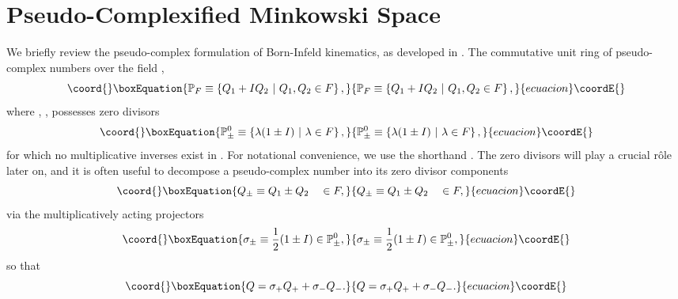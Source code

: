 \documentclass[a4paper,aps,prd,showkeys,showpacs,superscriptaddress,preprint]{revtex4}
\providecommand{\pc}{\mathbb{P}}
\providecommand{\reals}{\mathbb{R}}
\begin{document}
\section{Pseudo-Complexified Minkowski Space\label{sec_pcM}}
We briefly review the pseudo-complex formulation of Born-Infeld
kinematics, as developed in \cite{Schuller:2002fn, Schuller:2002rr}.
The commutative unit ring of pseudo-complex numbers  over the field
\myHighlight{$F \in \{\reals, \mathbb{C}\}$}\coordHE{},
\begin{equation}\coord{}\boxEquation{
  \pc_F \equiv \left\{ Q_1 + I Q_2 \,\, | \,\, Q_1, Q_2 \in F \right\},
}{
  \pc_F \equiv \left\{ Q_1 + I Q_2 \,\, | \,\, Q_1, Q_2 \in F \right\},
}{ecuacion}\coordE{}\end{equation}
where \coordHE{}, \coordHE{}, possesses zero divisors
\begin{equation}\coord{}\boxEquation{\label{zerodiv}
  \pc_\pm^0 \equiv \left\{ \lambda(1\pm I)\,\, |\,\, \lambda \in F
  \right\},
}{\pc_\pm^0 \equiv \left\{ \lambda(1\pm I)\,\, |\,\, \lambda \in F
  \right\},
}{ecuacion}\coordE{}\end{equation}
for which no multiplicative inverses exist in \myHighlight{$\pc_F$}\coordHE{}.
For notational convenience, we use the shorthand \myHighlight{$\pc \equiv \pc_\reals$}\coordHE{}. 
The zero divisors will play a crucial r\^ole later on, and it is 
often useful to decompose a pseudo-complex number \myHighlight{$Q
= Q_1 + I Q_2 \in \pc_F$}\coordHE{} into its zero divisor components 
\begin{equation}\coord{}\boxEquation{
  Q_\pm \equiv Q_1 \pm Q_2 \quad \in F,
}{
  Q_\pm \equiv Q_1 \pm Q_2 \quad \in F,
}{ecuacion}\coordE{}\end{equation}
via the multiplicatively acting projectors
\begin{equation}\coord{}\boxEquation{
  \sigma_\pm \equiv \frac{1}{2}(1 \pm I) \in \pc^0_\pm,
}{
  \sigma_\pm \equiv \frac{1}{2}(1 \pm I) \in \pc^0_\pm,
}{ecuacion}\coordE{}\end{equation}
so that
\begin{equation}\coord{}\boxEquation{\label{zd_comp}
  Q = \sigma_+ Q_+ + \sigma_- Q_-.
}{Q = \sigma_+ Q_+ + \sigma_- Q_-.
}{ecuacion}\coordE{}\end{equation}
\end{document}
